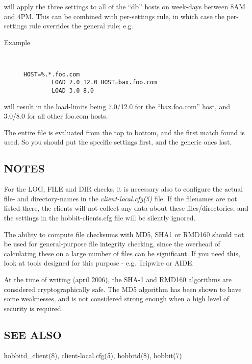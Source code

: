   will apply the three settings to all of the ``db'' hosts on
  week-days between 8AM and 4PM. This can be combined with
  per-settings rule, in which case the per-settings rule overrides the
  general rule; e.g. 

\begin{description}\item[Example]\begin{verbatim}


HOST=%.*.foo.com
        LOAD 7.0 12.0 HOST=bax.foo.com
        LOAD 3.0 8.0

\end{verbatim}


\end{description}



  will result in the load-limits being 7.0/12.0 for the
  ``bax.foo.com'' host, and 3.0/8.0 for all other foo.com hosts. 

  The entire file is evaluated from the top to bottom, and the first
  match found is used. So you should put the specific settings first,
  and the generic ones last. 
 
\subsection{NOTES}
 For the LOG, FILE and DIR checks, it is necessary also to configure
 the actual file- and directory-names in the
 \emph{client-local.cfg(5)} file. If the filenames are not listed
 there, the clients will not collect any data about these
 files/directories, and the settings in the hobbit-clients.cfg file
 will be silently ignored. 


  The ability to compute file checksums with MD5, SHA1 or RMD160
  should not be used for general-purpose file integrity checking,
  since the overhead of calculating these on a large number of files
  can be significant. If you need this, look at tools designed for
  this purpose - e.g. Tripwire or AIDE. 



  At the time of writing (april 2006), the SHA-1 and RMD160 algorithms
  are considered cryptographically safe. The MD5 algorithm has been
  shown to have some weaknesses, and is not considered strong enough
  when a high level of security is required. 



\subsection{SEE ALSO}
hobbitd\_client(8), client-local.cfg(5), hobbitd(8), hobbit(7) 


